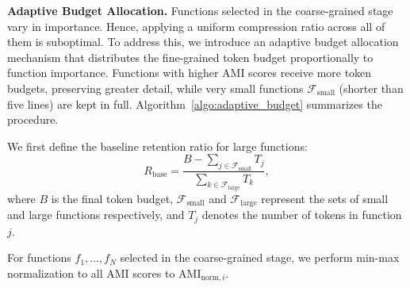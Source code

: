 \documentclass[10pt,conference]{IEEEtran}
\begin{document}
\noindent\textbf{Adaptive Budget Allocation.}
Functions selected in the coarse-grained stage vary in importance. Hence, applying a uniform compression ratio across all of them is suboptimal. To address this, we introduce an adaptive budget allocation mechanism that distributes the fine-grained token budget proportionally to function importance. Functions with higher AMI scores receive more token budgets, preserving greater detail, while very small functions $\mathcal{F}_{\text{small}}$ (shorter than five lines) are kept in full. Algorithm~\ref{algo:adaptive_budget} summarizes the procedure. 

We first define the baseline retention ratio for large functions:
\begin{equation}
R_{\text{base}} = \frac{B - \sum_{j \in \mathcal{F}_{\text{small}}} T_j}{\sum_{k \in \mathcal{F}_{\text{large}}} T_k},
\label{eq:global_large_ratio}
\end{equation}
where $B$ is the final token budget, $\mathcal{F}_{\text{small}}$ and $\mathcal{F}_{\text{large}}$ represent the sets of small and large functions respectively, and $T_j$ denotes the number of tokens in function $j$.

For functions \(f_1,\ldots,f_N\) selected in the coarse-grained stage, we perform min-max normalization to all AMI scores to $\text{AMI}_{\text{norm}, i}$.


\end{document}
